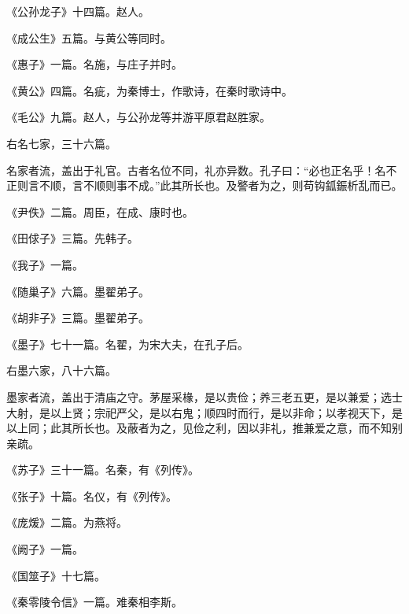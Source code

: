 \documentclass[12pt,UTF8]{ctexbook}
\begin{document}
《公孙龙子》十四篇。赵人。



《成公生》五篇。与黄公等同时。



《惠子》一篇。名施，与庄子并时。



《黄公》四篇。名疵，为秦博士，作歌诗，在秦时歌诗中。



《毛公》九篇。赵人，与公孙龙等并游平原君赵胜家。



右名七家，三十六篇。



名家者流，盖出于礼官。古者名位不同，礼亦异数。孔子曰：“必也正名乎！名不正则言不顺，言不顺则事不成。”此其所长也。及譥者为之，则苟钩鈲鋠析乱而已。



《尹佚》二篇。周臣，在成、康时也。



《田俅子》三篇。先韩子。



《我子》一篇。



《随巢子》六篇。墨翟弟子。



《胡非子》三篇。墨翟弟子。



《墨子》七十一篇。名翟，为宋大夫，在孔子后。



右墨六家，八十六篇。



墨家者流，盖出于清庙之守。茅屋采椽，是以贵俭；养三老五更，是以兼爱；选士大射，是以上贤；宗祀严父，是以右鬼；顺四时而行，是以非命；以孝视天下，是以上同；此其所长也。及蔽者为之，见俭之利，因以非礼，推兼爱之意，而不知别亲疏。



《苏子》三十一篇。名秦，有《列传》。



《张子》十篇。名仪，有《列传》。



《庞煖》二篇。为燕将。



《阙子》一篇。



《国筮子》十七篇。



《秦零陵令信》一篇。难秦相李斯。
\end{document}
